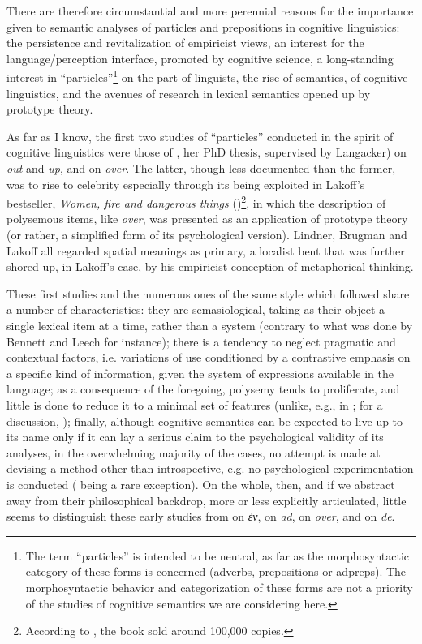 \documentclass[english,output=paper,colorlinks,citecolor=brown]{../langscibook}
\begin{document}
There are therefore circumstantial and more perennial reasons for the importance given to semantic analyses of particles and prepositions in cognitive linguistics: the persistence and revitalization of empiricist views, an interest for the language\slash perception interface, promoted by cognitive science, a long-standing interest in “particles”\footnote{\textrm{ The term “particles” is intended to be neutral, as far as the morphosyntactic category of these forms is concerned (adverbs, prepositions or adpreps). The morphosyntactic behavior and categorization of these forms are not a priority of the studies of cognitive semantics we are considering here. }} on the part of linguists, the rise of semantics, of cognitive linguistics, and the avenues of research in lexical semantics opened up by prototype theory.

As far as I know, the first two studies of “particles” conducted in the spirit of cognitive linguistics were those of \citet{Lindner1981}, her PhD thesis, supervised by Langacker) on \textit{out} and \textit{up}, and \citet{Brugman1981} on \textit{over}. The latter, though less documented than the former, was to rise to celebrity especially through its being exploited in Lakoff’s bestseller, \textit{Women, fire and dangerous things} (\citeyear{Lakoff1987})\footnote{According to \citet{Peeters2001}, the book sold around 100,000 copies.}, in which the description of polysemous items, like \textit{over}, was presented as an application of prototype theory (or rather, a simplified form of its psychological version). Lindner, Brugman and Lakoff all regarded spatial meanings as primary, a localist bent that was further shored up, in Lakoff’s case, by his empiricist conception of metaphorical thinking.

These first studies and the numerous ones of the same style which followed share a number of characteristics: they are semasiological, taking as their object a single lexical item at a time, rather than a system (contrary to what was done by Bennett and Leech for instance); there is a tendency to neglect pragmatic and contextual factors, i.e. variations of use conditioned by a contrastive emphasis on a specific kind of information, given the system of expressions available in the language; as a consequence of the foregoing, polysemy tends to proliferate, and little is done to reduce it to a minimal set of features (unlike, e.g., in \citealt{Pottier1962}; for a discussion, \citealt{Fortis2009}); finally, although cognitive semantics can be expected to live up to its name only if it can lay a serious claim to the psychological validity of its analyses, in the overwhelming majority of the cases, no attempt is made at devising a method other than introspective, e.g. no psychological experimentation is conducted (\citealt{SandraRice1995} being a rare exception). On the whole, then, and if we abstract away from their philosophical backdrop, more or less explicitly articulated, little seems to distinguish these early studies from \citet{Aristotle1957} on \textit{ἐν}, \citet{Leibniz1923Analysis} on \textit{ad}, \citet{Harris1773} on \textit{over}, and \citet{Condillac1775} on \textit{de}.
\end{document}
